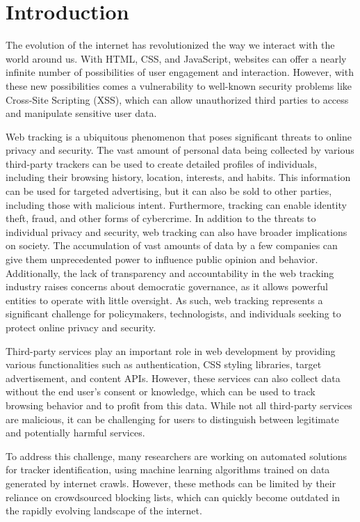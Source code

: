 \chapter{Introduction}
\label{cha:introduction}

The evolution of the internet has revolutionized the way we interact with the world around us.
With HTML, CSS, and JavaScript, websites can offer a nearly infinite number of possibilities of user
engagement and interaction. However, with these new possibilities comes a vulnerability to well-known
security problems like Cross-Site Scripting (XSS), which can allow unauthorized third parties to access
and manipulate sensitive user data.

Web tracking is a ubiquitous phenomenon that poses significant threats to online privacy and security.
The vast amount of personal data being collected by various third-party trackers can be used to create
detailed profiles of individuals, including their browsing history, location, interests, and habits.
This information can be used for targeted advertising, but it can also be sold to other parties,
including those with malicious intent. Furthermore, tracking can enable identity theft,
fraud, and other forms of cybercrime. In addition to the threats to individual privacy and security,
web tracking can also have broader implications on society. The accumulation of vast amounts of data by a
few companies can give them unprecedented power to influence public opinion and behavior.
Additionally, the lack of transparency and accountability in the web tracking industry raises
concerns about democratic governance, as it allows powerful entities to operate with
little oversight. As such, web tracking represents a significant challenge for policymakers,
technologists, and individuals seeking to protect online privacy and security.

Third-party services play an important role in web development by providing various functionalities
such as authentication, CSS styling libraries, target advertisement, and content APIs. 
However, these services can also collect data without the end user's consent or knowledge,
which can be used to track browsing behavior and to profit from this data. 
While not all third-party services are malicious, it can be challenging for users to distinguish between
legitimate and potentially harmful services.

To address this challenge, many researchers are working on automated solutions 
for tracker identification, using machine learning algorithms trained on data generated
by internet crawls. However, these methods can be limited by their reliance
on crowdsourced blocking lists, which can quickly become outdated in
the rapidly evolving landscape of the internet.

